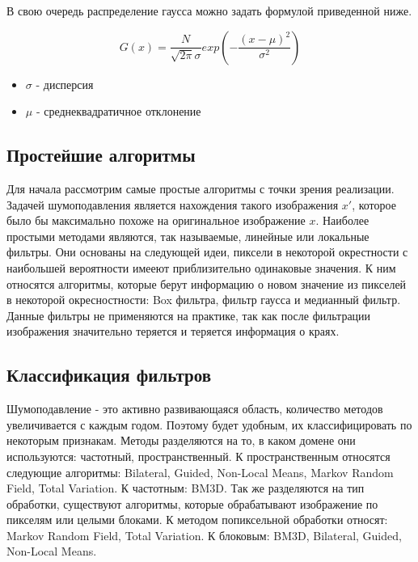 В свою очередь распределение гаусса можно задать формулой приведенной ниже.

\begin{equation}\label{eGaussNoise}
	G(x)=\frac{N}{\sqrt{2\pi}\sigma}exp(-\frac{(x-\mu)^2}{\sigma^2})	
\end{equation}
\begin{itemize}
	\item $\sigma$ - дисперсия 
	\item $\mu$ - среднеквадратичное отклонение
\end{itemize}


\subsection{Простейшие алгоритмы}
Для начала рассмотрим самые простые алгоритмы с точки зрения реализации.
Задачей шумоподавления является нахождения такого изображения $x'$, которое было бы максимально похоже на оригинальное изображение $x$. 
Наиболее простыми методами являются, так называемые, линейные или локальные фильтры. Они основаны на следующей идеи, пиксели в некоторой окрестности с наибольшей вероятности имееют приблизительно одинаковые значения. К ним относятся алгоритмы, которые берут информацию о новом значение из пикселей в некоторой окресностности: Box фильтра, фильтр гаусса и медианный фильтр. Данные фильтры не применяются на практике, так как после фильтрации изображения значительно теряется и теряется информация о краях.

\subsection{Классификация фильтров}
Шумоподавление - это активно развивающаяся область, количество методов увеличивается с каждым годом. Поэтому будет удобным, их классифицировать по некоторым признакам. Методы разделяются на то, в каком домене они используются: частотный, пространственный.
К пространственным относятся следующие алгоритмы: Bilateral, Guided, Non-Local Means, Markov Random Field, Total Variation.
К частотным: BM3D.
Так же разделяются на тип обработки, существуют алгоритмы, которые обрабатывают изображение по пикселям или целыми блоками.
К методом попиксельной обработки относят: Markov Random Field, Total Variation.
К блоковым: BM3D, Bilateral, Guided, Non-Local Means.

